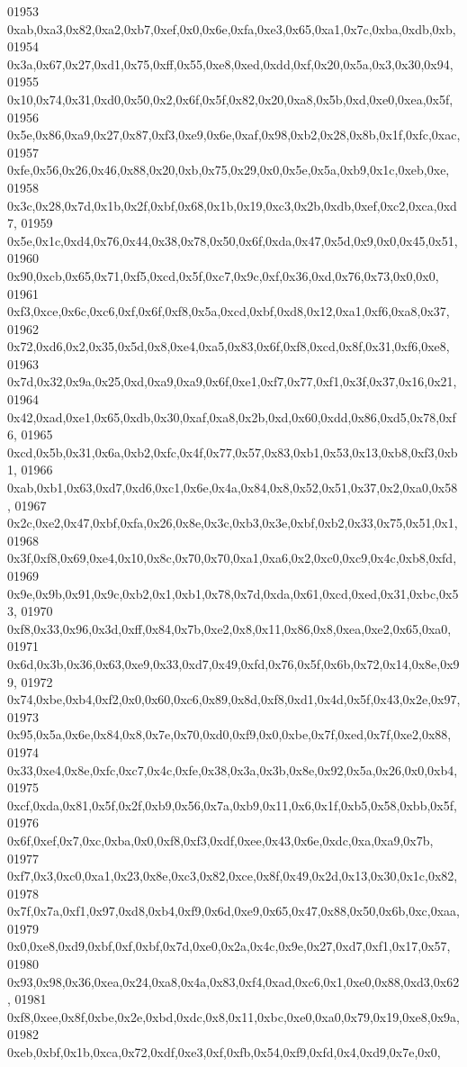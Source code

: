 \begin{DoxyCode}
01953   0xab,0xa3,0x82,0xa2,0xb7,0xef,0x0,0x6e,0xfa,0xe3,0x65,0xa1,0x7c,0xba,0xdb,0xb,
01954   0x3a,0x67,0x27,0xd1,0x75,0xff,0x55,0xe8,0xed,0xdd,0xf,0x20,0x5a,0x3,0x30,0x94,
01955   0x10,0x74,0x31,0xd0,0x50,0x2,0x6f,0x5f,0x82,0x20,0xa8,0x5b,0xd,0xe0,0xea,0x5f,
01956   0x5e,0x86,0xa9,0x27,0x87,0xf3,0xe9,0x6e,0xaf,0x98,0xb2,0x28,0x8b,0x1f,0xfc,0xac,
01957   0xfe,0x56,0x26,0x46,0x88,0x20,0xb,0x75,0x29,0x0,0x5e,0x5a,0xb9,0x1c,0xeb,0xe,
01958   0x3c,0x28,0x7d,0x1b,0x2f,0xbf,0x68,0x1b,0x19,0xc3,0x2b,0xdb,0xef,0xc2,0xca,0xd7,
01959   0x5e,0x1c,0xd4,0x76,0x44,0x38,0x78,0x50,0x6f,0xda,0x47,0x5d,0x9,0x0,0x45,0x51,
01960   0x90,0xcb,0x65,0x71,0xf5,0xcd,0x5f,0xc7,0x9c,0xf,0x36,0xd,0x76,0x73,0x0,0x0,
01961   0xf3,0xce,0x6c,0xc6,0xf,0x6f,0xf8,0x5a,0xcd,0xbf,0xd8,0x12,0xa1,0xf6,0xa8,0x37,
01962   0x72,0xd6,0x2,0x35,0x5d,0x8,0xe4,0xa5,0x83,0x6f,0xf8,0xcd,0x8f,0x31,0xf6,0xe8,
01963   0x7d,0x32,0x9a,0x25,0xd,0xa9,0xa9,0x6f,0xe1,0xf7,0x77,0xf1,0x3f,0x37,0x16,0x21,
01964   0x42,0xad,0xe1,0x65,0xdb,0x30,0xaf,0xa8,0x2b,0xd,0x60,0xdd,0x86,0xd5,0x78,0xf6,
01965   0xcd,0x5b,0x31,0x6a,0xb2,0xfc,0x4f,0x77,0x57,0x83,0xb1,0x53,0x13,0xb8,0xf3,0xb1,
01966   0xab,0xb1,0x63,0xd7,0xd6,0xc1,0x6e,0x4a,0x84,0x8,0x52,0x51,0x37,0x2,0xa0,0x58,
01967   0x2c,0xe2,0x47,0xbf,0xfa,0x26,0x8e,0x3c,0xb3,0x3e,0xbf,0xb2,0x33,0x75,0x51,0x1,
01968   0x3f,0xf8,0x69,0xe4,0x10,0x8c,0x70,0x70,0xa1,0xa6,0x2,0xc0,0xc9,0x4c,0xb8,0xfd,
01969   0x9e,0x9b,0x91,0x9c,0xb2,0x1,0xb1,0x78,0x7d,0xda,0x61,0xcd,0xed,0x31,0xbc,0x53,
01970   0xf8,0x33,0x96,0x3d,0xff,0x84,0x7b,0xe2,0x8,0x11,0x86,0x8,0xea,0xe2,0x65,0xa0,
01971   0x6d,0x3b,0x36,0x63,0xe9,0x33,0xd7,0x49,0xfd,0x76,0x5f,0x6b,0x72,0x14,0x8e,0x99,
01972   0x74,0xbe,0xb4,0xf2,0x0,0x60,0xc6,0x89,0x8d,0xf8,0xd1,0x4d,0x5f,0x43,0x2e,0x97,
01973   0x95,0x5a,0x6e,0x84,0x8,0x7e,0x70,0xd0,0xf9,0x0,0xbe,0x7f,0xed,0x7f,0xe2,0x88,
01974   0x33,0xe4,0x8e,0xfc,0xc7,0x4c,0xfe,0x38,0x3a,0x3b,0x8e,0x92,0x5a,0x26,0x0,0xb4,
01975   0xcf,0xda,0x81,0x5f,0x2f,0xb9,0x56,0x7a,0xb9,0x11,0x6,0x1f,0xb5,0x58,0xbb,0x5f,
01976   0x6f,0xef,0x7,0xc,0xba,0x0,0xf8,0xf3,0xdf,0xee,0x43,0x6e,0xdc,0xa,0xa9,0x7b,
01977   0xf7,0x3,0xc0,0xa1,0x23,0x8e,0xc3,0x82,0xce,0x8f,0x49,0x2d,0x13,0x30,0x1c,0x82,
01978   0x7f,0x7a,0xf1,0x97,0xd8,0xb4,0xf9,0x6d,0xe9,0x65,0x47,0x88,0x50,0x6b,0xc,0xaa,
01979   0x0,0xe8,0xd9,0xbf,0xf,0xbf,0x7d,0xe0,0x2a,0x4c,0x9e,0x27,0xd7,0xf1,0x17,0x57,
01980   0x93,0x98,0x36,0xea,0x24,0xa8,0x4a,0x83,0xf4,0xad,0xc6,0x1,0xe0,0x88,0xd3,0x62,
01981   0xf8,0xee,0x8f,0xbe,0x2e,0xbd,0xdc,0x8,0x11,0xbc,0xe0,0xa0,0x79,0x19,0xe8,0x9a,
01982   0xeb,0xbf,0x1b,0xca,0x72,0xdf,0xe3,0xf,0xfb,0x54,0xf9,0xfd,0x4,0xd9,0x7e,0x0,

\end{DoxyCode}
